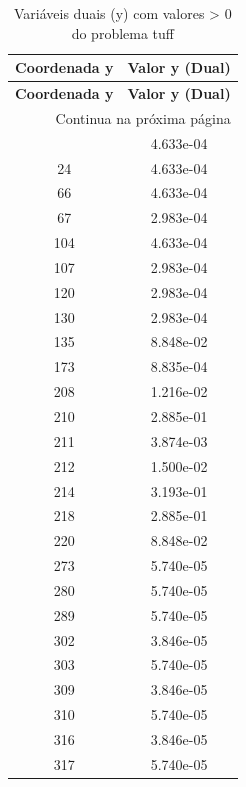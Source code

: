 \documentclass[12pt]{article}
\begin{document}
\begin{longtable}{@{}cc@{}}
\caption{Variáveis duais (y) com valores > 0 do problema tuff} \\
\toprule
\textbf{Coordenada y} & \textbf{Valor y (Dual)} \\
\midrule
\endfirsthead

\toprule
\textbf{Coordenada y} & \textbf{Valor y (Dual)} \\
\midrule
\endhead

\midrule \multicolumn{2}{r}{{Continua na próxima página}} \\ \midrule
\endfoot

\bottomrule
\endlastfoot
15 & 4.633e-04 \\
24 & 4.633e-04 \\
66 & 4.633e-04 \\
67 & 2.983e-04 \\
104 & 4.633e-04 \\
107 & 2.983e-04 \\
120 & 2.983e-04 \\
130 & 2.983e-04 \\
135 & 8.848e-02 \\
173 & 8.835e-04 \\
208 & 1.216e-02 \\
210 & 2.885e-01 \\
211 & 3.874e-03 \\
212 & 1.500e-02 \\
214 & 3.193e-01 \\
218 & 2.885e-01 \\
220 & 8.848e-02 \\
273 & 5.740e-05 \\
280 & 5.740e-05 \\
289 & 5.740e-05 \\
302 & 3.846e-05 \\
303 & 5.740e-05 \\
309 & 3.846e-05 \\
310 & 5.740e-05 \\
316 & 3.846e-05 \\
317 & 5.740e-05 \\

\bottomrule
\end{longtable}
\end{document}
